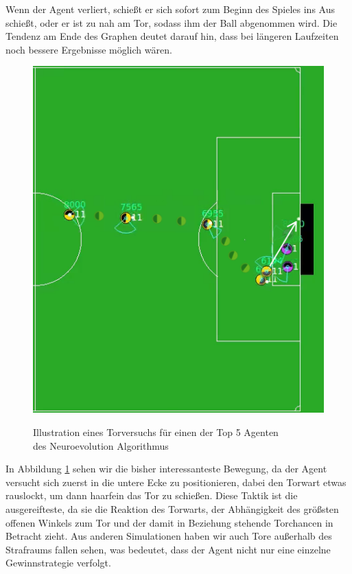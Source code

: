                 \noindent
                Wenn der Agent verliert, schießt er sich sofort zum Beginn des Spieles ins Aus schießt, oder er ist zu nah am Tor, sodass ihm der Ball abgenommen wird. Die Tendenz am Ende des Graphen deutet darauf hin, dass bei längeren Laufzeiten noch bessere Ergebnisse möglich wären.%
\newpage
        \begin{figure}[H]
            \begin{center}
                \includegraphics[scale=0.83]{../pictures/games/neural-evo-gameplay.png}\\
                \caption{Illustration eines Torversuchs für einen der Top 5 Agenten \\ des Neuroevolution Algorithmus \label{fig:neural-evo-gameplay}}
            \end{center}
        \end{figure}
        In Abbildung \ref{fig:neural-evo-gameplay} sehen wir die bisher interessanteste Bewegung, da der Agent versucht sich zuerst in die untere Ecke zu positionieren, dabei den Torwart etwas rauslockt, um dann haarfein das Tor zu schießen. Diese Taktik ist die ausgereifteste, da sie die Reaktion des Torwarts, der Abhängigkeit des größsten offenen Winkels zum Tor und der damit in Beziehung stehende Torchancen in Betracht zieht. Aus anderen Simulationen haben wir auch Tore außerhalb des Strafraums fallen sehen, was bedeutet, dass der Agent nicht nur eine einzelne Gewinnstrategie verfolgt.
\newpage

